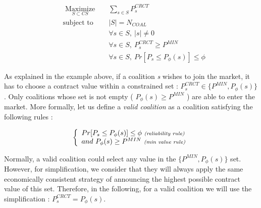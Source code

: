 \documentclass[conference]{IEEEtran}
\begin{document}
\begin{equation}
\begin{aligned}
& \underset{S \subset CS}{ \text{ Maximize }}
& & \sum_{s \in S}  P_{s}^{CRCT} \\
& \text{subject to} 
& &	|S| = N_{COAL} \\
&&& \forall s \in S,\ |s| \neq 0  \\
&&& \forall s \in S,\  P_{s}^{CRCT} \geq P^{MIN} \\
&&& \forall s \in S,\  Pr[P_{s} \leq P_{\phi}(s)] \leq \phi
\end{aligned}
\label{problem}
\end{equation}

As explained in the example above, if a coalition \textit{s} wishes to join the market, it has to choose a contract value within a constrained set : $ P_{s}^{CRCT} \in \{ P^{MIN}, P_{\phi}(s) \}$. Only coalitions whose set is not empty ( $ P_{\phi}(s) \geq P^{MIN} $ ) are able to enter the market. More formally, let us define a \textit{valid coalition} as a coalition satisfying the following rules :

\begin{equation}
\left\{ \begin{array}{lll}
		Pr[ P_{s} \leq P_{\phi}(s)] \leq \phi\ \textit{{\scriptsize (reliability rule)}} \\
		and\ P_{\phi}(s) \geq P^{MIN}\ \textit{{\scriptsize (min value rule)}}

\end{array} \right. 
\label{rules}
\end{equation}

Normally, a valid coalition could select any value in the $ \{ P^{MIN}, P_{\phi}(s) \}$ set. However, for simplification, we consider that they will always apply the same economically consistent strategy of announcing the highest possible contract value of this set. Therefore, in the following, for a valid coalition we will use the simplification : $ P_{s}^{CRCT} = P_{\phi}(s) $.
\end{document}
